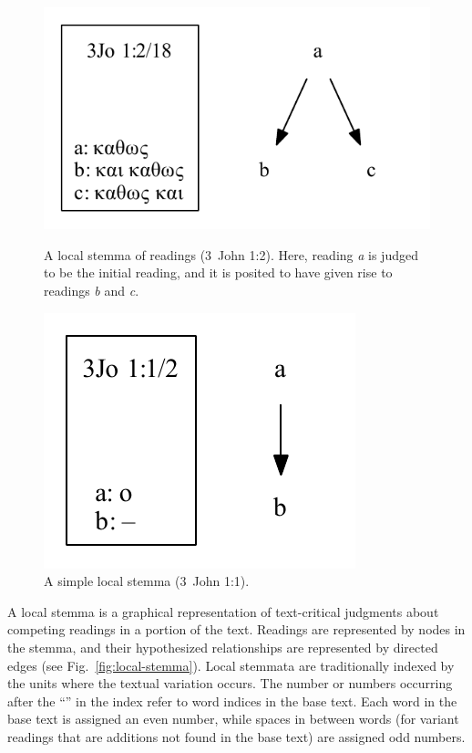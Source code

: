 \documentclass[a4paper, 12pt]{article}
\begin{document}
	\begin{figure}
		\vspace{-\baselineskip}
		\centering
		\includegraphics[scale=0.6666]{../graphics/B25K1V2U18-local-stemma.pdf}
		\caption{A local stemma of readings (3~John 1:2). Here, reading \emph{a} is judged to be the initial reading, and it is posited to have given rise to readings \emph{b} and \emph{c}.}
		\label{fig:local-stemma}
		\vspace{\baselineskip}
		\includegraphics[scale=0.6666]{../graphics/B25K1V1U2-local-stemma.pdf}
		\caption{A simple local stemma (3~John 1:1).}
		\label{fig:local-stemma-simple}
	\end{figure}
	\noindent
	A local stemma is a graphical representation of text-critical judgments about competing readings in a portion of the text. Readings are represented by nodes in the stemma, and their hypothesized relationships are represented by directed edges (see Fig.~\ref{fig:local-stemma}). Local stemmata are traditionally indexed by the units where the textual variation occurs. The number or numbers occurring after the ``\ForwardSlash '' in the index refer to word indices in the base text. Each word in the base text is assigned an even number, while spaces in between words (for variant readings that are additions not found in the base text) are assigned odd numbers. 
	
\end{document}
